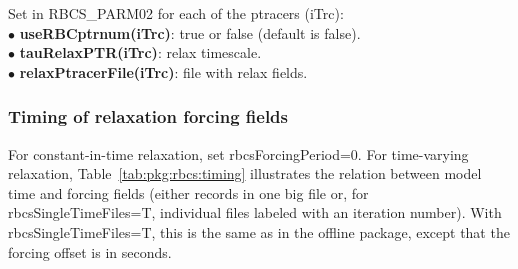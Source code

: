 \vspace{.5cm}
\noindent
Set in {RBCS\_PARM02} for each of the ptracers (iTrc):\\
$\bullet$ {\bf useRBCptrnum(iTrc)}: true or false (default
is false).\\
$\bullet$ {\bf tauRelaxPTR(iTrc)}: relax timescale.\\
$\bullet$ {\bf relaxPtracerFile(iTrc)}: file with relax
fields.\\


\subsubsection{Timing of relaxation forcing fields}

For constant-in-time relaxation, set rbcsForcingPeriod=0.
For time-varying relaxation, Table~\ref{tab:pkg:rbcs:timing} illustrates the
relation between model time and forcing fields (either records in
one big file or, for rbcsSingleTimeFiles=T, individual files labeled with an
iteration number).  With rbcsSingleTimeFiles=T, this is the same as in the
offline package, except that the forcing offset is in seconds.
\newcommand{\dtr}{\Delta t_{\text{rbcs}}}%
